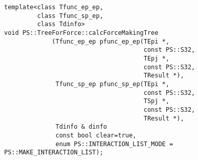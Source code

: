 \begin{screen}
\begin{verbatim}
template<class Tfunc_ep_ep,
         class Tfunc_sp_ep,
         class Tdinfo>
void PS::TreeForForce::calcForceMakingTree
             (Tfunc_ep_ep pfunc_ep_ep(TEpi *,
                                      const PS::S32,
                                      TEpj *,
                                      const PS::S32,
                                      TResult *),
              Tfunc_sp_ep pfunc_sp_ep(TEpi *,
                                      const PS::S32,
                                      TSpj *,
                                      const PS::S32,
                                      TResult *),
              Tdinfo & dinfo
              const bool clear=true,
              enum PS::INTERACTION_LIST_MODE = PS::MAKE_INTERACTION_LIST);
\end{verbatim}
\end{screen}

